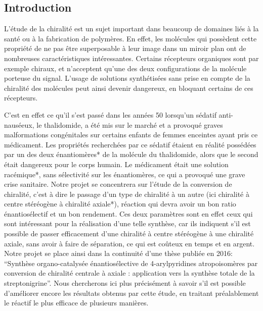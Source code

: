 \documentclass{article}
\begin{document}
\newpage
\begin{center}
\section*{Introduction}
\end{center}
\bigskip
\bigskip\bigskip
L’étude de la chiralité est un sujet important dans beaucoup de domaines liés à la santé ou à la fabrication de polymères. En effet, les molécules qui possèdent cette propriété de ne pas être superposable à leur image dans un miroir plan ont de nombreuses caractéristiques intéressantes. Certains récepteurs organiques sont par exemple chiraux, et n’acceptent qu’une des deux configurations de la molécule porteuse du signal. L’usage de solutions synthétisées sans prise en compte de la chiralité des molécules peut ainsi devenir dangereux, en bloquant certains de ces récepteurs.\par
\bigbreak
C’est en effet ce qu’il s’est passé dans les années 50 lorsqu’un sédatif anti-nauséeux, le thalidomide, a été mis sur le marché et a provoqué graves malformations congénitales sur certains enfants de femmes enceintes ayant pris ce médicament. Les propriétés recherchées par ce sédatif étaient en réalité possédées par un des deux énantiomères* de la molécule du thalidomide, alors que le second était dangereux pour le corps humain. Le médicament était une solution racémique*, sans sélectivité sur les énantiomères, ce qui a provoqué une grave crise sanitaire.
\medbreak
Notre projet se concentrera sur l’étude de la conversion de chiralité, c’est à dire le passage d’un type de chiralité à un autre (ici chiralité à centre stéréogène à chiralité axiale*), réaction qui devra avoir un bon ratio énantiosélectif et un bon rendement. Ces deux paramètres sont en effet ceux qui sont intéressant pour la réalisation d’une telle synthèse, car ils indiquent s’il est possible de passer efficacement d’une chiralité à centre stéréogène à une chiralité axiale, sans avoir à faire de séparation, ce qui est coûteux en temps et en argent.
\medbreak
Notre projet se place ainsi dans la continuité d’une thèse publiée en 2016: “Synthèse organo-catalysée énantiosélective de 4-arylpyridines atropoisomères par conversion de chiralité centrale à axiale : application vers la synthèse totale de la streptonigrine”. Nous chercherons ici plus précisément à savoir s’il est possible d’améliorer encore les résultats obtenus par cette étude, en traitant préalablement le réactif le plus efficace de plusieurs manières.
\medbreak
\end{document}
